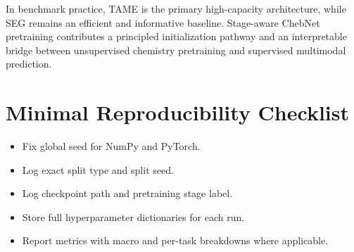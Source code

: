 \documentclass[11pt,a4paper]{article}
\begin{document}
In benchmark practice, TAME is the primary high-capacity architecture, while SEG remains an efficient and informative baseline. Stage-aware ChebNet pretraining contributes a principled initialization pathway and an interpretable bridge between unsupervised chemistry pretraining and supervised multimodal prediction.

\appendix
\section{Minimal Reproducibility Checklist}
\begin{itemize}
    \item Fix global seed for NumPy and PyTorch.
    \item Log exact split type and split seed.
    \item Log checkpoint path and pretraining stage label.
    \item Store full hyperparameter dictionaries for each run.
    \item Report metrics with macro and per-task breakdowns where applicable.
\end{itemize}
\end{document}
